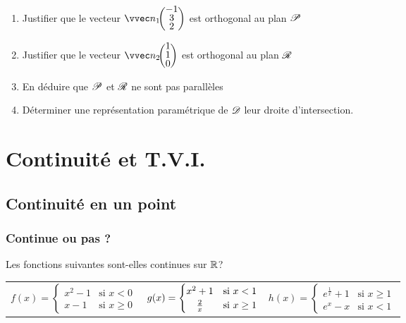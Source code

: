 \documentclass[oneside,12pt]{book}          %
\begin{document}
\begin{enumerate}
    \item Justifier que le vecteur $\vcoord{n_1}{-1\\3\\2}$ est orthogonal au plan ${\mathscr{P}}$
    \item Justifier que le vecteur $\vcoord{n_2}{1\\1\\0}$ est orthogonal au plan ${\mathscr{R}}$
    \item En déduire que ${\mathscr{P}}$ et ${\mathscr{R}}$ ne sont pas parallèles
    \item Déterminer une représentation paramétrique de ${\mathscr{D}}$ leur droite d'intersection.
\end{enumerate}




\chapter{Continuité et T.V.I.}
\newpage

\section{Continuité en un point}


\subsection{Continue ou pas ?}
Les fonctions suivantes sont-elles continues sur ${\mathbb R}$?

\begin{tabular}{p{} p{} p{}}
    $f(x)=\begin{cases}
    		x^2-1 & \text{si } x<0 \\
    		x-1 & \text{si } x\geq0
    		\end{cases}$
    &
     $g(x)=\begin{cases}
     			x^2+1 & \text{si } x<1 \\
     			\hfil \frac{2}{x} & \text{si } x\geq1
     		\end{cases}$
    &
    $h(x)=\begin{cases}
    		e^{\frac{1}{x}}+1 & \text{si } x\geq1\\
    		e^x-x & \text{si } x<1
    		\end{cases}$
\end{tabular}
\end{document}
